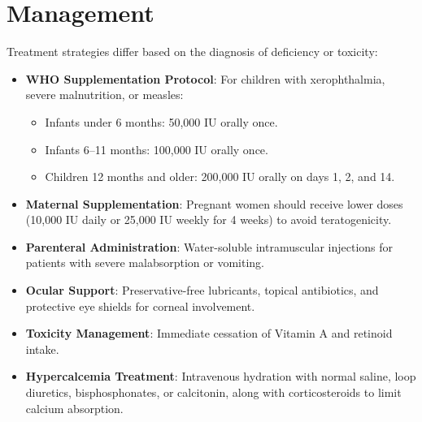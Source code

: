 \section*{Management}
Treatment strategies differ based on the diagnosis of deficiency or toxicity:
\begin{itemize}
    \item \textbf{WHO Supplementation Protocol}: For children with xerophthalmia, severe malnutrition, or measles:
    \begin{itemize}
        \item Infants under 6 months: 50,000 IU orally once.
        \item Infants 6--11 months: 100,000 IU orally once.
        \item Children 12 months and older: 200,000 IU orally on days 1, 2, and 14.
    \end{itemize}
    \item \textbf{Maternal Supplementation}: Pregnant women should receive lower doses (10,000 IU daily or 25,000 IU weekly for 4 weeks) to avoid teratogenicity.
    \item \textbf{Parenteral Administration}: Water-soluble intramuscular injections for patients with severe malabsorption or vomiting.
    \item \textbf{Ocular Support}: Preservative-free lubricants, topical antibiotics, and protective eye shields for corneal involvement.
    \item \textbf{Toxicity Management}: Immediate cessation of Vitamin A and retinoid intake.
    \item \textbf{Hypercalcemia Treatment}: Intravenous hydration with normal saline, loop diuretics, bisphosphonates, or calcitonin, along with corticosteroids to limit calcium absorption.
\end{itemize}

